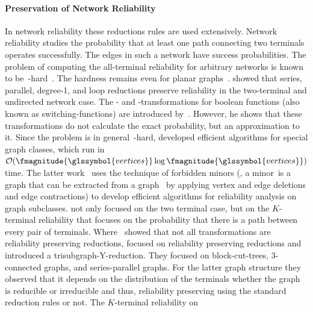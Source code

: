 \paragraph{Preservation of Network Reliability}
% 
In network reliability these reductions rules are used extensively. Network
reliability studies the probability that at least one path connecting two
terminals operates successfully. The edges in such a network have success
probabilities. The problem of computing the all-terminal reliability for
arbitrary networks is known to be~\NP-hard~\parencite{Pro83,Val79a}. The hardness
remains even for planar graphs~\parencite{Ver05}. 
% 
% 
\textcite{Leh63} showed that series, parallel, degree-1, and loop reductions
preserve reliability in the two-terminal and undirected network case. The
- and -transformations for boolean functions
(also known as switching-functions) are introduced by~\textcite[Section
4]{Leh63}. However, he shows that these transformations do not calculate the
exact probability, but an approximation to it.
% 
% 
Since the problem is in general~\NP-hard, \textcite{Sat93} developed efficient
algorithms for special graph classes, which run
in~$\bigO(\fmagnitude{\glssymbol{vertices}}\log\fmagnitude{\glssymbol{vertices}})$
time.
% 
% 
The latter work~\parencite{Sat93} uses the technique of forbidden minors (\ie, a
minor~\minor is a graph that can be extracted from a graph~ by
applying vertex and edge deletions and edge contractions) to develop efficient
algorithms for reliability analysis on graph subclasses. \citeauthor{Sat93} not
only focused on the two terminal case, but on the $K$-terminal reliability that
focuses on the probability that there is a path between every pair of terminals.
Where~\textcite{Leh63} showed that not all transformations are reliability
preserving reductions, \textcite{Sat93} focused on reliability preserving
reductions and introduced a
\gls{trisubgraph}-Y-reduction. They focused on block-cut-trees, $3$-connected
graphs, and series-parallel graphs. For the latter graph structure they observed
that it depends on the distribution of the terminals whether the graph is
reducible or irreducible and thus, reliability preserving using the standard
reduction rules or not. The $K$-terminal reliability on
